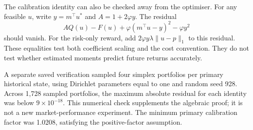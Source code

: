\documentclass[sigconf,review]{acmart}
\begin{document}
The calibration identity can also be checked away from the optimiser. For any feasible $u$, write $y=m^\top u^*$ and $A=1+2\varphi y$. The residual
\begin{equation}
 A Q(u)-F(u)+\varphi(m^\top u-y)^2-\varphi y^2
\end{equation}
should vanish. For the risk-only reward, add $2\varphi y\lambda\|u-p\|_1$ to this residual. These equalities test both coefficient scaling and the cost convention. They do not test whether estimated moments predict future returns accurately.

A separate saved verification sampled four simplex portfolios per primary historical state, using Dirichlet parameters equal to one and random seed 928. Across 1,728 sampled portfolios, the maximum absolute residual for each identity was below $9\times10^{-18}$. This numerical check supplements the algebraic proof; it is not a new market-performance experiment. The minimum primary calibration factor was 1.0208, satisfying the positive-factor assumption.
\end{document}
